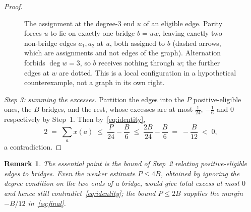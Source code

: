 \documentclass{baustms}
\theoremstyle{cupthm}
\theoremstyle{cupdefn}
\theoremstyle{cuprem}
\newtheorem{remark}[theorem]{Remark}
\begin{document}
\begin{proof}
\begin{figure}[ht]
\centering
{}
\caption{The assignment at the degree-$3$ end $u$ of an eligible edge. Parity
forces $u$ to lie on exactly one bridge $b=uw$, leaving exactly two non-bridge
edges $a_1,a_2$ at $u$, both assigned to $b$ (dashed arrows, which are
assignments and not edges of the graph). Alternation forbids $\deg w = 3$, so
$b$ receives nothing through $w$; the further edges at $w$ are dotted. This is a
local configuration in a hypothetical counterexample, not a graph in its own
right.}\label{fig:assign}
\end{figure}

\smallskip
\emph{Step 3: summing the excesses.} Partition the edges into the $P$
positive-eligible ones, the $B$ bridges, and the rest, whose excesses are at most
$\tfrac1{24}$, $-\tfrac16$ and $0$ respectively by Step~1. Then
by~\eqref{eq:identity},
\begin{equation}\label{eq:final}
  2 \;=\; \sum_a x(a) \;\le\; \frac{P}{24} - \frac{B}{6}
     \;\le\; \frac{2B}{24} - \frac{B}{6} \;=\; -\frac{B}{12} \;<\; 0 ,
\end{equation}
a contradiction.
\end{proof}

\begin{remark}
The essential point is the bound of Step~2 relating positive-eligible edges to
bridges. Even the weaker estimate $P \le 4B$, obtained by ignoring the degree
condition on the two ends of a bridge, would give total excess at most $0$ and
hence still contradict~\eqref{eq:identity}; the bound $P \le 2B$ supplies the
margin $-B/12$ in~\eqref{eq:final}.
\end{remark}
\end{document}
